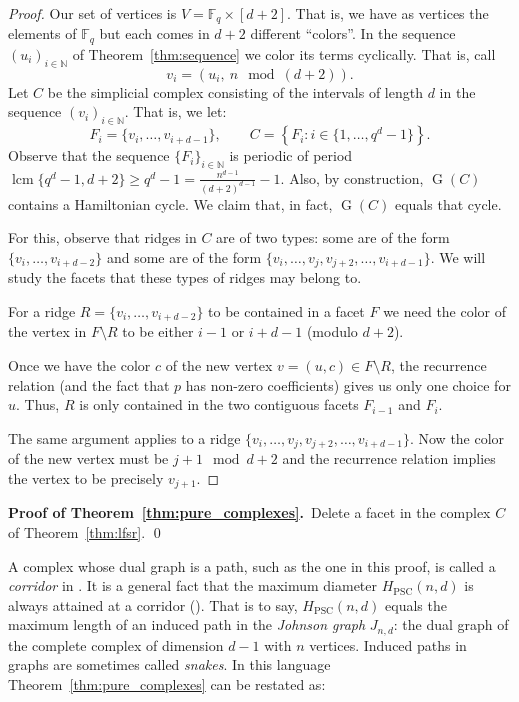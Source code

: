 \documentclass[12pt,a4paper]{article}
\newcommand{\graph}{\operatorname{G}}
\newcommand{\lcm}{\operatorname{lcm}}
\newcommand{\PSC}{{\textrm{PSC}}}
\newcommand{\F}{\mathbb F}
\newcommand{\N}{\mathbb N}
\theoremstyle{plain}
\theoremstyle{definition}
\begin{document}
\begin{proof}
Our set of vertices is $V=\F_q \times [d+2]$. That is, we have as vertices the elements of $\F_q$ but each comes in $d+2$ different ``colors''. In the sequence $(u_i)_{i\in \N}$ of Theorem~\ref{thm:sequence} we color its terms cyclically. That is, call
\[
v_i=(u_i,\ n \mod(d+2)).
\]
Let $C$ be the simplicial complex consisting of the intervals of length $d$ in the sequence $(v_i)_{i\in \N}$. That is, we let:
\[
F_i= \{v_i,\dots,v_{i+d-1}\}, \qquad
C= \left\{F_i : i\in \{1,\dots, q^d-1\} \right\}.
\]
Observe that the sequence $\{F_i\}_{i\in \N}$ is periodic of period $\lcm\{q^d-1, d+2\} \ge q^d-1=\frac{n^{d-1}}{(d+2)^{d-1}}-1$. Also, by construction, $\graph(C)$ contains a Hamiltonian cycle. We claim that, in fact, $\graph(C)$ equals that cycle. 

For this, observe that ridges in  $C$ are of two types: some are of the form $\{v_i,\dots,v_{i+d-2}\}$ and some are of the form $\{v_i,\dots,v_j,v_{j+2},\dots,v_{i+d-1}\}$. We will study the facets that these types of ridges may belong to.

For a ridge $R=\{v_i,\dots,v_{i+d-2}\}$ to be contained in a facet $F$ we need the color of the vertex in $F\setminus R$ to be either $i-1$ or $i+d-1$ (modulo $d+2$).

Once we have  the color $c$ of the new vertex $v=(u,c)\in F\setminus R$, the recurrence relation (and the fact that $p$ has non-zero coefficients) gives us only one choice for $u$. Thus, $R$ is only contained in the two contiguous facets $F_{i-1}$ and $F_i$.

The same argument applies to a ridge $\{v_i,\dots,v_j,v_{j+2},\dots,v_{i+d-1}\}$. Now the color of the new vertex must be $j+1\mod d+2$ and the recurrence relation implies the vertex to be precisely $v_{j+1}$.
\end{proof}

\medskip
\noindent
\textbf{Proof of Theorem~\ref{thm:pure_complexes}.}\ 
Delete a  facet in the complex $C$ of Theorem~\ref{thm:lfsr}.
\qed
\medskip

A complex whose dual graph is a path, such as the one in this proof, is called
a \emph{corridor} in \cite{Santos:progress}. It is a general fact that the maximum diameter $H_\PSC(n,d)$ is always attained at a corridor (\cite[Corollary 2.7]{Santos:progress}). That is to say, $H_\PSC(n,d)$ equals the maximum length of an induced path in the \emph{Johnson graph} $J_{n,d}$: the dual graph of the complete complex of dimension $d-1$ with $n$ vertices. Induced paths in graphs are sometimes called \emph{snakes}.  In this language Theorem~\ref{thm:pure_complexes} can be restated as:
\end{document}
